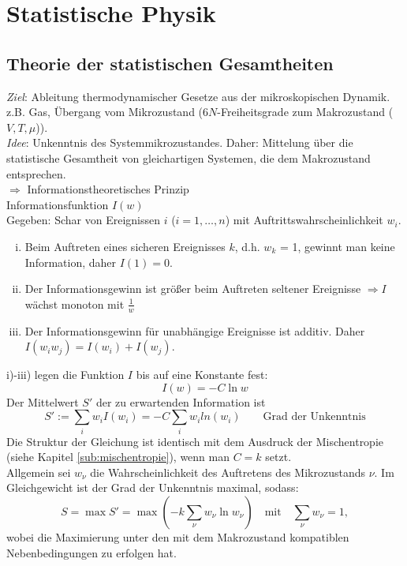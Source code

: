 \section{Statistische Physik}
\subsection{Theorie der statistischen Gesamtheiten}
\label{sub:theo:statsums}
\emph{Ziel}: Ableitung thermodynamischer Gesetze aus der mikroskopischen Dynamik. \\
z.B. Gas, Übergang vom Mikrozustand ($6N$-Freiheitsgrade zum Makrozustand ($V, T, \mu$)). \\
\emph{Idee}: Unkenntnis des Systemmikrozustandes. Daher: Mittelung über die statistische Gesamtheit von gleichartigen Systemen, die dem
Makrozustand entsprechen. \\
$\Rightarrow$ Informationstheoretisches Prinzip \\[\baselineskip]
Informationsfunktion $I(w)$\\
Gegeben: Schar von Ereignissen $i$ ($i=1, \ldots, n$) mit Auftrittswahrscheinlichkeit $w_i$.
\begin{enumerate}[i)]
    \item Beim Auftreten eines sicheren Ereignisses $k$, d.h. $w_k$ = 1, gewinnt man keine Information, daher $I(1)=0$.
    \item Der Informationsgewinn ist größer beim Auftreten seltener Ereignisse $\Rightarrow I$ wächst monoton mit $\frac{1}{w}$
    \item Der Informationsgewinn für unabhängige Ereignisse ist additiv. Daher $I(w_i w_j) = I(w_i)+I(w_j)$.
\end{enumerate}
i)-iii) legen die Funktion $I$ bis auf eine Konstante fest:
\begin{equation}
    I(w) = -C \ln w
\end{equation}
Der Mittelwert $S'$ der zu erwartenden Information ist
\begin{equation}
    S' := \sum_{i} w_i I(w_i) = - C \sum_i w_i ln(w_i) \qquad \text{Grad der Unkenntnis}
\end{equation}
Die Struktur der Gleichung ist identisch mit dem Ausdruck der Mischentropie (siehe Kapitel \ref{sub:mischentropie}),
wenn man $C=k$ setzt. \\[\baselineskip]
Allgemein sei $w_\nu$ die Wahrscheinlichkeit des Auftretens des Mikrozustands $\nu$. Im Gleichgewicht ist der Grad der Unkenntnis maximal,
sodass:
\begin{equation}
    S = \max S' = \max \left( -k \sum_\nu w_\nu \ln w_\nu \right) \quad \text{mit} \quad \sum_\nu w_\nu = 1,
\end{equation}
wobei die Maximierung unter den mit dem Makrozustand kompatiblen Nebenbedingungen zu erfolgen hat.

